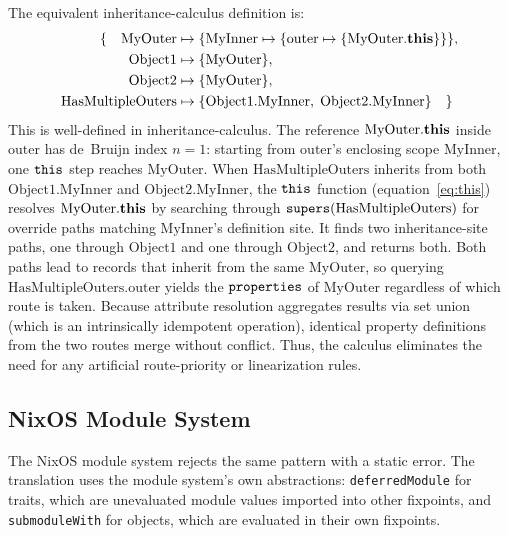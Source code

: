 The equivalent inheritance-calculus definition is:
\begin{align*}
  \{ \quad \mathrm{MyOuter} &\mapsto \{
      \mathrm{MyInner} \mapsto \{
    \mathrm{outer} \mapsto \{\mathrm{MyOuter}.\mathbf{this}\}\}\}, \\
    \mathrm{Object1} &\mapsto \{\mathrm{MyOuter}\}, \\
    \mathrm{Object2} &\mapsto \{\mathrm{MyOuter}\}, \\
    \mathrm{HasMultipleOuters} &\mapsto \{
      \mathrm{Object1}.\mathrm{MyInner},\;
    \mathrm{Object2}.\mathrm{MyInner}\}
  \quad \}
\end{align*}
This is well-defined in inheritance-calculus.
The reference
$\mathrm{MyOuter}.\mathbf{this}$ inside $\mathrm{outer}$
has de~Bruijn index $n = 1$:
starting from $\mathrm{outer}$'s enclosing scope
$\mathrm{MyInner}$, one $\mathtt{this}$ step reaches
$\mathrm{MyOuter}$.
When $\mathrm{HasMultipleOuters}$ inherits from both
$\mathrm{Object1}.\mathrm{MyInner}$ and
$\mathrm{Object2}.\mathrm{MyInner}$,
the $\mathtt{this}$ function (equation~\ref{eq:this}) resolves
$\mathrm{MyOuter}.\mathbf{this}$ by searching through
$\mathtt{supers}(\mathrm{HasMultipleOuters})$ for override paths matching
$\mathrm{MyInner}$'s definition site.
It finds two inheritance-site paths, one through
$\mathrm{Object1}$ and one through $\mathrm{Object2}$, and
returns both.
Both paths lead to records that inherit from the same
$\mathrm{MyOuter}$, so querying
$\mathrm{HasMultipleOuters}.\mathrm{outer}$ yields the
$\mathtt{properties}$ of $\mathrm{MyOuter}$ regardless of which
route is taken.
Because attribute resolution aggregates results via set union (which is an intrinsically idempotent operation), identical property definitions from the two routes merge without conflict. Thus, the calculus eliminates the need for any artificial route-priority or linearization rules.

\subsection*{NixOS Module System}

The NixOS module system rejects the same pattern with a static error.
The translation uses the module system's own abstractions:
\texttt{deferredModule} for traits, which are unevaluated module values imported
into other fixpoints, and \texttt{submoduleWith} for objects, which are evaluated
in their own fixpoints.

